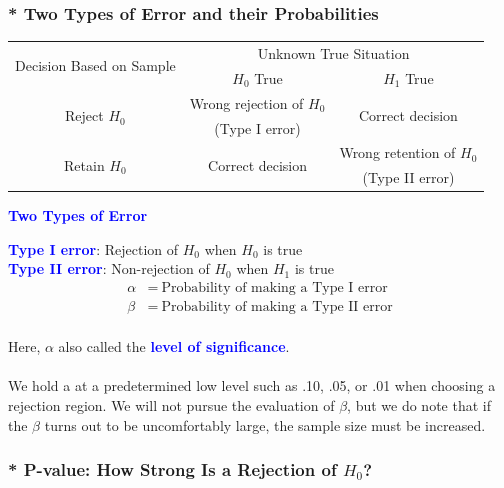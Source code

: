 \documentclass[12pt,a4paper]{article}
\begin{document}
\subsubsection*{* Two Types of Error and their Probabilities}
\begin{table}[h!]\centering
	\begin{tabular}{c||c|c}
		\toprule[1.5pt]
		\multirow{2}{*}{Decision Based on Sample} & \multicolumn{2}{c}{Unknown True Situation}   \\ \cline{2-3} 
		 & $H_0$ True & $H_1$ True \\ \hline\hline
		\multirow{2}{*}{Reject $H_0$} & Wrong rejection of $H_0$ & \multirow{2}{*}{Correct decision} \\
		 & (Type I error) &           \\ \hline
		\multirow{2}{*}{Retain $H_0$} &  \multirow{2}{*}{Correct decision} & Wrong retention of $H_0$ \\
		&           & (Type II error) \\
		\bottomrule[1.5pt]
	\end{tabular}
\end{table}
\begin{tcolorbox}[colback=white]\begin{center}
		\textcolor{blue}{\bf Two Types of Error}
	\end{center}
	\textcolor{blue}{\bf Type I error}: Rejection of $H_0$ when $H_0$ is true \\
	\textcolor{blue}{\bf Type II error}: Non-rejection of $H_0$ when $H_1$ is true \begin{align*}
	\alpha &=\ \text{Probability of making a Type I error} \\
	\beta &=\ \text{Probability of making a Type II error} \\
	\end{align*}
\end{tcolorbox} Here, $\alpha$ also called the \textcolor{blue}{\bf level of significance}. \\
\\
We hold a at a predetermined low level such as .10, .05, or .01 when choosing a rejection region. We will not pursue the evaluation of $\beta$, but we do note that if the $\beta$ turns out to be uncomfortably large, the sample size must be increased.

\subsubsection*{* P-value: How Strong Is a Rejection of $H_0$?}
\end{document}

